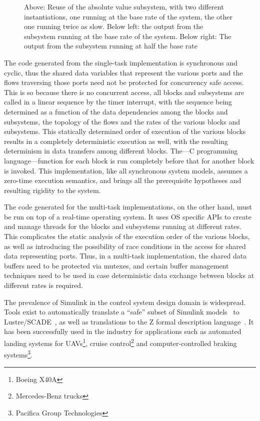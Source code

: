 \begin{figure}
\caption{Above: Reuse of the absolute value subsystem, with two
  different instantiations, one running at the base rate of the
  system, the other one running twice as slow. Below left: the output
  from the subsystem running at the base rate of the system. Below
  right: The output from the subsystem running at half the base rate}
\label{fig:abs_output_graphs}
\end{figure}

The code generated from the single-task implementation is synchronous
and cyclic, thus the shared data variables that represent the various
ports and the flows traversing those ports need not be protected for
concurrency safe access. This is so because there is no concurrent
access, all blocks and subsystems are called in a linear sequence by
the timer interrupt, with the sequence being determined as a function
of the data dependencies among the blocks and subsystems, the topology
of the flows and the rates of the various blocks and subsystems. This
statically determined order of execution of the various blocks results
in a completely deterministic execution as well, with the resulting
determinism in data transfers among different blocks. The---C
programming language---function for each block is run completely
before that for another block is invoked. This implementation, like
all synchronous system models, assumes a zero-time execution
semantics, and brings all the prerequisite hypotheses and resulting
rigidity to the system.

The code generated for the multi-task implementations, on the other
hand, must be run on top of a real-time operating system. It uses OS
specific APIs to create and manage threads for the blocks and
subsystems running at different rates. This complicates the static
analysis of the execution order of the various blocks, as well as
introducing the possibility of race conditions in the access for
shared data representing ports. Thus, in a multi-task implementation,
the shared data buffers need to be protected via mutexes, and certain
buffer management techniques need to be used in case deterministic
data exchange between blocks at different rates is required.

The prevalence of Simulink in the control system design domain is
widespread. Tools exist to automatically translate a ``safe'' subset
of Simulink models~\cite{caspi@emsoft04} to
Lustre/SCADE~\cite{caspi@sigplan03}, as well as translations to the Z
formal description language~\cite{arthan@icfem00}. It has been
successfully used in the industry for applications such as automated
landing systems for UAVs\footnote{Boeing X40A}, cruise
control\footnote{Mercedes-Benz trucks} and computer-controlled braking
systems\footnote{Pacifica Group Technologies}.


